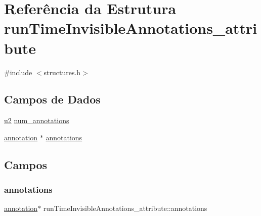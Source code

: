 \hypertarget{structrunTimeInvisibleAnnotations__attribute}{}\section{Referência da Estrutura run\+Time\+Invisible\+Annotations\+\_\+attribute}
\label{structrunTimeInvisibleAnnotations__attribute}


{\ttfamily \#include $<$structures.\+h$>$}

\subsection*{Campos de Dados}
\begin{DoxyCompactItemize}
\item 
\hyperlink{lista__operandos_8h_a732cde1300aafb73b0ea6c2558a7a54f}{u2} \hyperlink{structrunTimeInvisibleAnnotations__attribute_a703d15c7112b673ff31b7e4b2d85782b}{num\+\_\+annotations}
\item 
\hyperlink{structannotation}{annotation} $\ast$ \hyperlink{structrunTimeInvisibleAnnotations__attribute_a8f62eb72b381abe0fcc559ad874cf60b}{annotations}
\end{DoxyCompactItemize}


\subsection{Campos}
\mbox{\label{structrunTimeInvisibleAnnotations__attribute_a8f62eb72b381abe0fcc559ad874cf60b}} 
\subsubsection{\texorpdfstring{annotations}{annotations}}
{\footnotesize\ttfamily \hyperlink{structannotation}{annotation}$\ast$ run\+Time\+Invisible\+Annotations\+\_\+attribute\+::annotations}

\mbox{\label{structrunTimeInvisibleAnnotations__attribute_a703d15c7112b673ff31b7e4b2d85782b}} 
